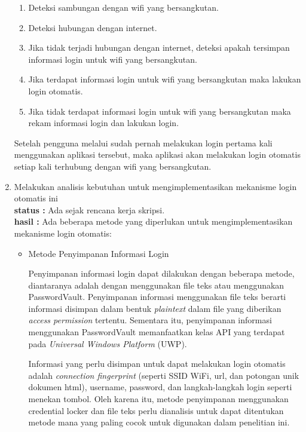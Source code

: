 \documentclass[a4paper,twoside]{article}
\begin{document}
\begin{enumerate}
\begin{enumerate}
    \item{Deteksi sambungan dengan wifi yang bersangkutan.}
    \item{Deteksi hubungan dengan internet.}
    \item{Jika tidak terjadi hubungan dengan internet, deteksi apakah tersimpan informasi login untuk wifi yang bersangkutan.}
    \item{Jika terdapat informasi login untuk wifi yang bersangkutan maka lakukan login otomatis.}
    \item{Jika tidak terdapat informasi login untuk wifi yang bersangkutan maka rekam informasi login dan lakukan login.}
\end{enumerate}

Setelah pengguna melalui sudah pernah melakukan login pertama kali menggunakan aplikasi tersebut, maka aplikasi akan melakukan login otomatis setiap kali terhubung dengan wifi yang bersangkutan.

		\item  Melakukan analisis kebutuhan untuk mengimplementasikan mekanisme login otomatis ini\\
		{\bf status :} Ada sejak rencana kerja skripsi.\\
		{\bf hasil :} Ada beberapa metode yang diperlukan untuk mengimplementasikan mekanisme login otomatis:
        \begin{itemize}
            \item{
                Metode Penyimpanan Informasi Login
                
                Penyimpanan informasi login dapat dilakukan dengan beberapa metode, diantaranya adalah dengan menggunakan file teks atau menggunakan PasswordVault. Penyimpanan informasi menggunakan file teks berarti informasi disimpan dalam bentuk \textit{plaintext} dalam file yang diberikan \textit{access permission} tertentu. Sementara itu, penyimpanan informasi menggunakan PasswordVault memanfaatkan kelas API yang terdapat pada \textit{Universal Windows Platform} (UWP).
                
                Informasi yang perlu disimpan untuk dapat melakukan login otomatis adalah \textit{connection fingerprint} (seperti SSID WiFi, url, dan potongan unik dokumen html), username, password, dan langkah-langkah login seperti menekan tombol. Oleh karena itu, metode penyimpanan menggunakan credential locker dan file teks perlu dianalisis untuk dapat ditentukan metode mana yang paling cocok untuk digunakan dalam penelitian ini.
                
}
\end{itemize}
\end{enumerate}
\end{document}
